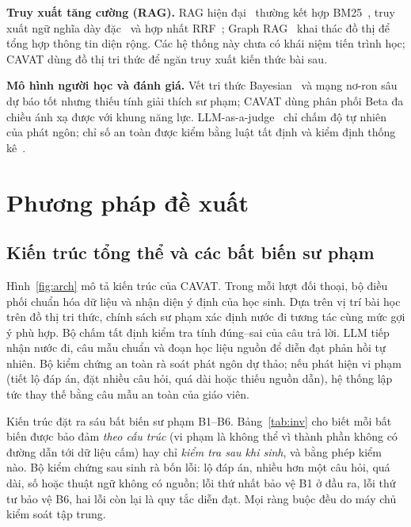 \documentclass[10pt,a4paper,twocolumn]{article}
\begin{document}
\textbf{Truy xuất tăng cường (RAG).} RAG hiện đại~\cite{lewis2020} thường kết hợp BM25~\cite{robertson2009}, truy xuất ngữ nghĩa dày đặc~\cite{karpukhin2020} và hợp nhất RRF~\cite{cormack2009}; Graph RAG~\cite{edge2024} khai thác đồ thị để tổng hợp thông tin diện rộng. Các hệ thống này chưa có khái niệm tiến trình học; CAVAT dùng đồ thị tri thức để ngăn truy xuất kiến thức bài sau.

\textbf{Mô hình người học và đánh giá.} Vết tri thức Bayesian~\cite{corbett1995,pelanek2017} và mạng nơ-ron sâu~\cite{piech2015} dự báo tốt nhưng thiếu tính giải thích sư phạm; CAVAT dùng phân phối Beta đa chiều ánh xạ được với khung năng lực. LLM-as-a-judge~\cite{zheng2023} chỉ chấm độ tự nhiên của phát ngôn; chỉ số an toàn được kiểm bằng luật tất định và kiểm định thống kê~\cite{wilson1927,efron1993,mcnemar1947}.

\section{Phương pháp đề xuất}\label{sec:method}

\subsection{Kiến trúc tổng thể và các bất biến sư phạm}
Hình~\ref{fig:arch} mô tả kiến trúc của CAVAT. Trong mỗi lượt đối thoại, bộ điều phối chuẩn hóa dữ liệu và nhận diện ý định của học sinh. Dựa trên vị trí bài học trên đồ thị tri thức, chính sách sư phạm xác định nước đi tương tác cùng mức gợi ý phù hợp. Bộ chấm tất định kiểm tra tính đúng--sai của câu trả lời. LLM tiếp nhận nước đi, câu mẫu chuẩn và đoạn học liệu nguồn để diễn đạt phản hồi tự nhiên. Bộ kiểm chứng an toàn rà soát phát ngôn dự thảo; nếu phát hiện vi phạm (tiết lộ đáp án, đặt nhiều câu hỏi, quá dài hoặc thiếu nguồn dẫn), hệ thống lập tức thay thế bằng câu mẫu an toàn của giáo viên.

Kiến trúc đặt ra sáu bất biến sư phạm B1--B6. Bảng~\ref{tab:inv} cho biết mỗi bất biến được bảo đảm \emph{theo cấu trúc} (vi phạm là không thể vì thành phần không có đường dẫn tới dữ liệu cấm) hay chỉ \emph{kiểm tra sau khi sinh}, và bằng phép kiểm nào. Bộ kiểm chứng sau sinh rà bốn lỗi: lộ đáp án, nhiều hơn một câu hỏi, quá dài, số hoặc thuật ngữ không có nguồn; lỗi thứ nhất bảo vệ B1 ở đầu ra, lỗi thứ tư bảo vệ B6, hai lỗi còn lại là quy tắc diễn đạt. Mọi ràng buộc đều do máy chủ kiểm soát tập trung.
\end{document}
